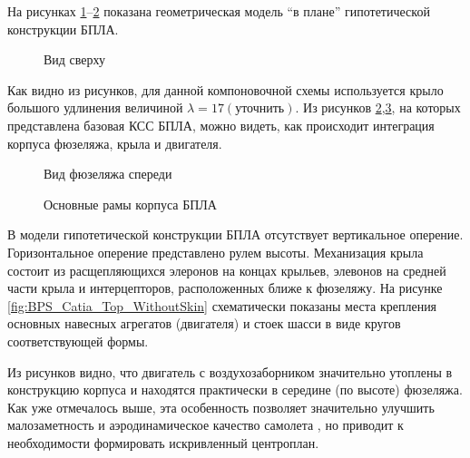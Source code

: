 На рисунках 
\ref{fig:BPS_Catia_Top}--\ref{fig:BPS_Catia_Front} показана геометрическая модель ``в плане'' гипотетической конструкции БПЛА.


\begin{figure}[H]
\centering
\def\svgwidth{0.9\textwidth}

\caption{Вид сверху}
\label{fig:BPS_Catia_Top}
\end{figure}

Как видно из рисунков, для данной компоновочной схемы используется крыло большого удлинения величиной $\lambda = 17 (\text{уточнить})$. Из рисунков \ref{fig:BPS_Catia_Front},\ref{fig:BPS_Catia_WithoutSkin}, на которых представлена базовая КСС БПЛА, можно видеть, как происходит интеграция корпуса фюзеляжа, крыла и двигателя. 

\begin{figure}[H]
\centering

\caption{Вид фюзеляжа спереди}
\label{fig:BPS_Catia_Front}
\end{figure}


\begin{figure}[H]
\centering
\def\svgwidth{0.9\textwidth}

\caption{Основные рамы корпуса БПЛА}
\label{fig:BPS_Catia_WithoutSkin}
\end{figure}

В модели гипотетической конструкции БПЛА отсутствует вертикальное оперение. Горизонтальное оперение представлено рулем высоты. Механизация крыла состоит из расщепляющихся элеронов на концах крыльев, элевонов на средней части крыла и интерцепторов, расположенных ближе к фюзеляжу. На рисунке \ref{fig:BPS_Catia_Top_WithoutSkin} схематически показаны места крепления основных навесных агрегатов (двигателя) и стоек шасси в виде кругов соответствующей формы. 

Из рисунков видно, что двигатель с воздухозаборником значительно утоплены в конструкцию корпуса и находятся практически в середине (по высоте) фюзеляжа. Как уже отмечалось выше, эта особенность позволяет значительно улучшить малозаметность и аэродинамическое качество самолета \cite{BPS}, но приводит к необходимости формировать искривленный центроплан. 


